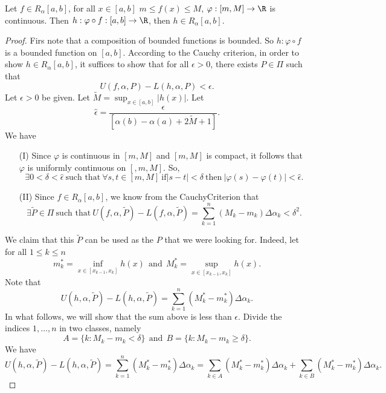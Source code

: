 \begin{theorem}[Rudin 6.11]\label{Rudin 6.11}
    Let \( f \in {R}_{\alpha}[a,b] \), for all \( x \in [a,b] \) \( m \leq f(x) \leq M  \), \( \varphi: [m,M] \to \R  \) is continuous. Then \( h: \varphi \circ f : [a,b] \to \R  \), then \( h \in {R}_{\alpha}[a,b] \).
\end{theorem}
\begin{proof}
    Firs note that a composition of bounded functions is bounded. So \( h: \varphi \circ f  \) is a bounded function on \( [a,b] \). According to the Cauchy criterion, in order to show \( h \in {R}_{\alpha}[a,b] \), it suffices to show that for all \( \epsilon > 0  \), there exists \( P \in \Pi \) such that  
    \[  U(f,\alpha, P) - L(h,\alpha,P) < \epsilon. \]
    Let \( \epsilon > 0  \) be given. Let \( \tilde{M} = \sup_{x \in [a,b]} | h(x) |  \). Let 
    \[  \hat{\epsilon} = \frac{ \epsilon }{ [\alpha(b) - \alpha(a) + 2 \tilde{M} + 1] }. \] 
    We have 
    \begin{enumerate}
        \item[(I)] Since \( \varphi  \) is continuous in \( [m,M] \) and \( [m,M] \) is compact, it follows that \( \varphi  \) is uniformly continuous on \( [,m,M] \). So,
            \[ \exists 0 < \delta < \hat{\epsilon} \ \text{such that} \ \forall s,t \in [m,M] \ \text{if} | s -t  |  < \delta \ \text{then} \ | \varphi(s) - \varphi(t) | < \hat{\epsilon}. \]
        \item[(II)] Since \( f \in {R}_{\alpha}[a,b] \), we know from the CauchyCriterion that 
            \[ \exists \tilde{P} \in \Pi \ \text{such that} \ U(f,\alpha,\tilde{P}) - L(f,\alpha, \tilde{P}) = \sum_{ k=1  }^{ n } ({M}_{k } - {m}_{k}) \Delta {\alpha}_{k } < \delta^{2}.  \]
    \end{enumerate}
    We claim that this \( \tilde{P} \) can be used as the \( P  \) that we were looking for. Indeed, let for all \( 1 \leq k \leq n  \)
    \[ {m}_{k }^{*} = \inf_{x \in [{x}_{k-1}, {x}_{k}]} h(x) \ \ \text{and} \ \ {M}_{k }^{*} = \sup_{x \in [{x}_{k-1}, {x}_{k}]} h(x). \]
    Note that
    \[  U(h,\alpha,\tilde{P}) - L(h,\alpha, \tilde{P}) = \sum_{ k=1  }^{ n } ({M}_{k }^{*} - {m}_{k }^{*}) \Delta {\alpha}_{k }.  \]
    In what follows, we will show that the sum above is less than \( \epsilon \). Divide the indices \( 1, \dots, n \) in two classes, namely
    \[  A = \{  k : {M}_{k } - {m}_{k } < \delta  \}  \ \ \text{and} \ \ B = \{  k : {M}_{k } - {m}_{k } \geq \delta \}. \]
    We have 
    \[  U(h,\alpha,\tilde{P}) - L(h,\alpha, \tilde{P}) = \sum_{ k=1  }^{ n } ({M}_{k }^{*} - {m}_{k }^{*}) \Delta {\alpha}_{k } = \sum_{k \in A} ({M}_{k }^{*} - {m}_{k }^{*}) \Delta {\alpha}_{k } + \sum_{k \in B} ({M}_{k}^{*} - {m}_{k }^{*}) \Delta {\alpha}_{k }. \tag{1}  \]

\end{proof}
